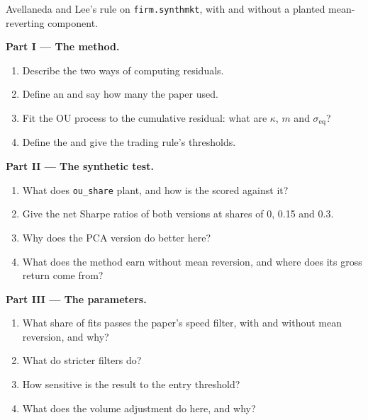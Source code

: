 \begin{problem}\label{pb:s1:residual-and-principal-component-stat-arb:1}
Avellaneda and Lee's rule on \texttt{firm.synthmkt}, with and without a planted mean-reverting component.

\medskip\noindent\textbf{Part I --- The method.}
\begin{enumerate}
\item Describe the two ways of computing residuals.
\item Define an  and say how many the paper used.
\item Fit the OU process to the cumulative residual: what are $\kappa$, $m$ and $\sigma_{\mathrm{eq}}$?
\item Define the  and give the trading rule's thresholds.
\end{enumerate}

\medskip\noindent\textbf{Part II --- The synthetic test.}
\begin{enumerate}[resume]
\item What does \texttt{ou\_share} plant, and how is the  scored against it?
\item Give the net Sharpe ratios of both versions at shares of 0, 0.15 and 0.3.
\item Why does the PCA version do better here?
\item What does the method earn without mean reversion, and where does its gross return come from?
\end{enumerate}

\medskip\noindent\textbf{Part III --- The parameters.}
\begin{enumerate}[resume]
\item What share of fits passes the paper's speed filter, with and without mean reversion, and why?
\item What do stricter filters do?
\item How sensitive is the result to the entry threshold?
\item What does the volume adjustment do here, and why?
\end{enumerate}


\end{problem}
